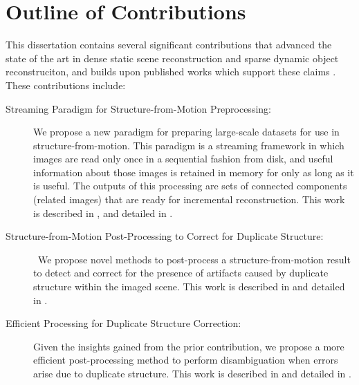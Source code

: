 

\section{Outline of Contributions}

This dissertation contains several significant contributions that advanced the state of the art in dense static scene reconstruction and sparse dynamic object reconstruciton, and builds upon published works which support these claims \cite{}.
These contributions include:
\begin{description}

\item[Streaming Paradigm for Structure-from-Motion Preprocessing:]
We propose a new paradigm for preparing large-scale datasets for use in structure-from-motion.
This paradigm is a streaming framework in which images are read only once in a sequential fashion from disk, and useful information about those images is  retained in memory for only as long as it is useful.
The outputs of this processing are sets of connected components (related images) that are ready for incremental reconstruction.
This work is described in \citet{heinly2015_streaming}, and detailed in .

\item[Structure-from-Motion Post-Processing to Correct for Duplicate Structure:]
~We propose novel methods to post-process a structure-from-motion result to detect and correct for the presence of artifacts caused by duplicate structure within the imaged scene.
This work is described in \citet{heinly2014_duplicate_structure} and detailed in .

\item[Efficient Processing for Duplicate Structure Correction:]
Given the insights gained from the prior contribution, we propose a more efficient post-processing method to perform disambiguation when errors arise due to duplicate structure.
This work is described in \citet{heinly2014_indistinguishable_geometry} and detailed in .

\end{description}

